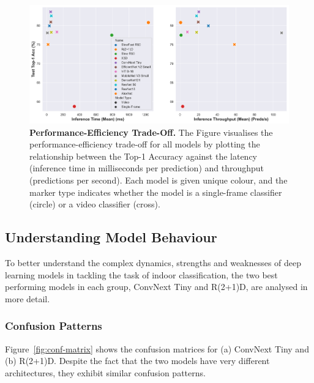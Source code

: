 \documentclass[a4paper]{article}
\begin{document}
\begin{figure}
\centering
\includegraphics[width=\textwidth]{
./figures/performance-efficiency-tradeoff-scatter.png}
\caption{
  \textbf{Performance-Efficiency Trade-Off.} The Figure visualises the
  performance-efficiency trade-off for all models by plotting the
  relationship between the Top-1 Accuracy against the latency (inference
  time in milliseconds per prediction) and throughput (predictions per
  second). Each model is given unique colour, and the marker type indicates
  whether the model is a single-frame classifier (circle) or a video
  classifier (cross).
}

\label{fig:tradeoff}
\end{figure}


\subsection{Understanding Model Behaviour} %
\label{sub:conf-matrices}

To better understand the complex dynamics, strengths and weaknesses of deep
learning models in tackling the task of indoor classification, the two best
performing models in each group, ConvNext Tiny and R(2+1)D, are analysed in more
detail.

\subsubsection{Confusion Patterns} %

Figure~\ref{fig:conf-matrix} shows the confusion matrices for (a) ConvNext Tiny
and (b) R(2+1)D. Despite the fact that the two models have very different
architectures, they exhibit similar confusion patterns.
\end{document}
